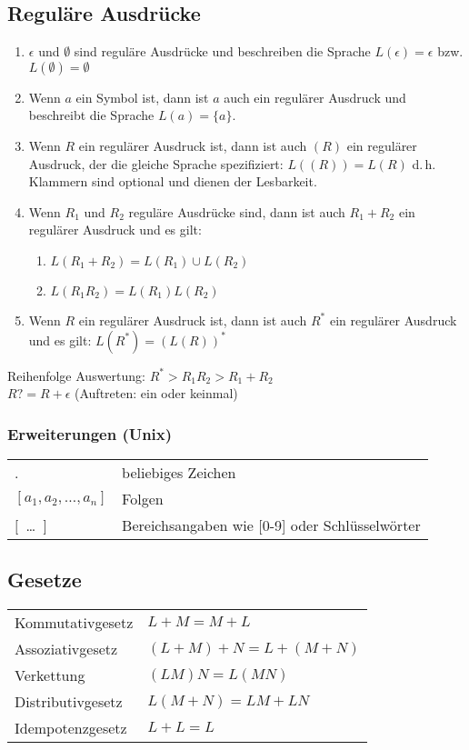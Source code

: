 \subsection{Reguläre Ausdrücke}
\begin{enumerate}\itemsep0em
	\item $\epsilon$ und $\emptyset$ sind reguläre Ausdrücke und beschreiben
	die Sprache $L(\epsilon) = \epsilon$ bzw. $L(\emptyset) = \emptyset$
	
	\item Wenn $a$ ein Symbol ist, dann ist $a$ auch ein regulärer Ausdruck und
	beschreibt die Sprache $L(a) = \{a\}$.
	
	\item Wenn $R$ ein regulärer Ausdruck ist, dann ist auch $(R)$ ein regulärer
	Ausdruck, der die gleiche Sprache spezifiziert: $L((R)) = L(R)$ 
	d.\,h. Klammern sind optional und dienen der Lesbarkeit.

	\item Wenn $R_1$ und $R_2$ reguläre Ausdrücke sind, dann ist auch $R_1 + R_2$ ein regulärer Ausdruck und es gilt: 
	\begin{enumerate}\itemsep0em
		\item $L(R_1 + R_2) = L(R_1) \cup L(R_2)$
		\item $L(R_1R_2) = L(R_1)L(R_2)$
	\end{enumerate}

	\item Wenn $R$ ein regulärer Ausdruck ist, dann ist auch $R^*$ ein regulärer Ausdruck und es gilt: $L(R^*) = (L(R))^*$

\end{enumerate}

Reihenfolge Auswertung: $R^* > R_1R_2 > R_1 + R_2$\\
$R? = R + \epsilon$ (Auftreten: ein oder keinmal)
\subsubsection{Erweiterungen (Unix)}
\settowidth{\MyLenA}{$[a_1, a_2, \dots, a_n]$~~}
\begin{tabular}{@{}p{\the\MyLenA}%
				@{}p{\linewidth-\the\MyLenA}}
. & beliebiges Zeichen\\
$[a_1, a_2, \dots, a_n]$ & Folgen\\
$[$~\dots~$]$ & Bereichsangaben wie [0-9] oder Schlüsselwörter
\end{tabular}

\subsection{Gesetze}
\settowidth{\MyLenA}{Kommutativgesetz~~}
\begin{tabular}{@{}p{\the\MyLenA}%
				@{}p{\linewidth-\the\MyLenA}}
Kommutativgesetz & $L + M = M + L$\\
Assoziativgesetz & $(L + M) + N = L + (M + N)$\\
Verkettung & $(LM)N = L(MN)$\\
Distributivgesetz & $L(M + N) = LM + LN$\\ 
Idempotenzgesetz & $L + L = L$
\end{tabular}
